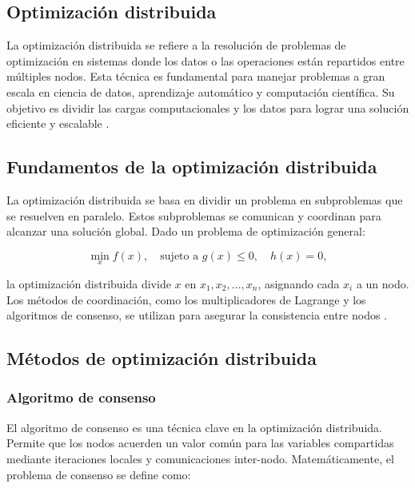 \begin{itemize}
		\subsection{Optimización distribuida}
		
		La optimización distribuida se refiere a la resolución de problemas de optimización en sistemas donde los datos o las operaciones están repartidos entre múltiples nodos. Esta técnica es fundamental para manejar problemas a gran escala en ciencia de datos, aprendizaje automático y computación científica. Su objetivo es dividir las cargas computacionales y los datos para lograr una solución eficiente y escalable \cite{boyd2011distributed}.
		
		\subsection{Fundamentos de la optimización distribuida}
		
		La optimización distribuida se basa en dividir un problema en subproblemas que se resuelven en paralelo. Estos subproblemas se comunican y coordinan para alcanzar una solución global. Dado un problema de optimización general:
		
		\begin{equation}
			\min_x f(x), \quad \text{sujeto a } g(x) \leq 0, \quad h(x) = 0,
		\end{equation}
		
		la optimización distribuida divide \(x\) en \(x_1, x_2, \dots, x_n\), asignando cada \(x_i\) a un nodo. Los métodos de coordinación, como los multiplicadores de Lagrange y los algoritmos de consenso, se utilizan para asegurar la consistencia entre nodos \cite{nocedal1999optimization}.
		
		\subsection{Métodos de optimización distribuida}
		
		\subsubsection{Algoritmo de consenso}
		
		El algoritmo de consenso es una técnica clave en la optimización distribuida. Permite que los nodos acuerden un valor común para las variables compartidas mediante iteraciones locales y comunicaciones inter-nodo. Matemáticamente, el problema de consenso se define como:
		

\end{itemize}
